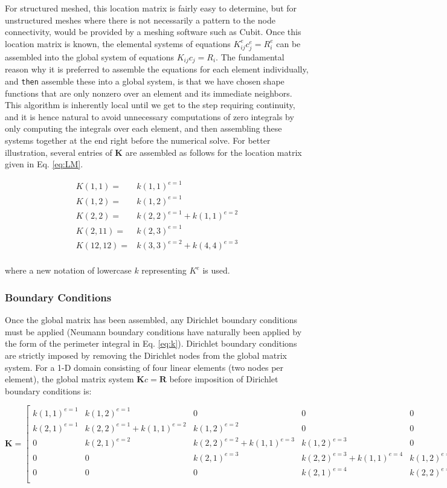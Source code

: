 \documentclass[10pt]{article}
\newcommand{\beq}{\begin{equation}}
\newcommand{\eeq}{\end{equation}}
\newcommand{\beqa}{\begin{equation}\begin{aligned}}
\newcommand{\eeqa}{\end{aligned}\end{equation}}
\begin{document}
For structured meshed, this location matrix is fairly easy to determine, but for unstructured meshes where there is not necessarily a pattern to the node connectivity, would be provided by a meshing software such as Cubit.  Once this location matrix is known, the elemental systems of equations \(K_{ij}^ec_j^e=R_i^e\) can be assembled into the global system of equations \(K_{ij}c_j=R_i\). The fundamental reason why it is preferred to assemble the equations for each element individually, and {\tt then} assemble these into a global system, is that we have chosen shape functions that are only nonzero over an element and its immediate neighbors. This algorithm is inherently local until we get to the step requiring continuity, and it is hence natural to avoid unnecessary computations of zero integrals by only computing the integrals over each element, and then assembling these systems together at the end right before the numerical solve. For better illustration, several entries of \textbf{K} are assembled as follows for the location matrix given in Eq. \eqref{eq:LM}.

\beqa
K(1, 1) =& k(1, 1)^{e=1}\\
K(1, 2) =& k(1, 2)^{e=1}\\
K(2, 2) =& k(2, 2)^{e=1}+k(1, 1)^{e=2}\\
K(2, 11) =& k(2, 3)^{e=1}\\
K(12, 12) =& k(3, 3)^{e=2}+k(4, 4)^{e=3}\\
\eeqa

where a new notation of lowercase \(k\) representing \(K^e\) is used.

\subsubsection{Boundary Conditions}
Once the global matrix has been assembled, any Dirichlet boundary conditions must be applied (Neumann boundary conditions have naturally been applied by the form of the perimeter integral in Eq. \eqref{eq:k}). Dirichlet boundary conditions are strictly imposed by removing the Dirichlet nodes from the global matrix system. For a 1-D domain consisting of four linear elements (two nodes per element), the global matrix system \(\textbf{K}c=\textbf{R}\) before imposition of Dirichlet boundary conditions is:

\beq
\textbf{K}=
\begin{bmatrix}
k(1, 1)^{e=1} & k(1, 2)^{e=1} & 0 & 0 & 0\\
k(2, 1)^{e=1} & k(2, 2)^{e=1}+k(1, 1)^{e=2} & k(1, 2)^{e=2} & 0 & 0\\
0 & k(2, 1)^{e=2} & k(2, 2)^{e=2}+k(1, 1)^{e=3} & k(1, 2)^{e=3} & 0\\
0 & 0 & k(2, 1)^{e=3} & k(2, 2)^{e=3}+k(1, 1)^{e=4} & k(1, 2)^{e=4}\\
0 & 0 & 0 & k(2, 1)^{e=4} & k(2, 2)^{e=4}\\
\end{bmatrix}
\eeq
\end{document}

